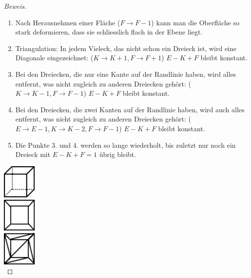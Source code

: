 \documentclass[%
11pt,%
twoside,%
titlepage,%
a4page,%
german,%
headsepline%
]{scrartcl}
\begin{document}
\begin{proof}[Beweis]
\begin{minipage}{0.618\textwidth}
\begin{enumerate}
\item Nach Herausnehmen einer Fl\"ache ($F\rightarrow F-1$) kann man die Oberfl\"ache so stark deformieren, dass sie schliesslich flach in der Ebene liegt.\\
\item Triangulation: In jedem Vieleck, das nicht schon ein Dreieck ist, wird eine Diagonale eingezeichnet: ($K\rightarrow K+1, F\rightarrow F+1$) $E-K+F$ bleibt konstant.\\
\item Bei den Dreiecken, die nur eine Kante auf der Randlinie haben, wird alles entfernt, was nicht zugleich zu anderen Dreiecken geh\"ort: ($K\rightarrow K-1, F\rightarrow  F-1$) $E-K+F$ bleibt konstant.\\
\item Bei den Dreiecken, die zwei Kanten auf der Randlinie haben, wird auch alles entfernt, was nicht zugleich zu anderen Dreiecken geh\"ort: ($E\rightarrow  E-1, K\rightarrow  K-2, F\rightarrow  F-1$) $E-K+F$ bleibt konstant.\\
\item Die Punkte 3. und 4. werden so lange wiederholt, bis zuletzt nur noch ein Dreieck mit $E-K+F=1$ \"ubrig bleibt.\\
\end{enumerate}
\end{minipage}
\hspace*{2cm}
\begin{minipage}{1.7cm}
\includegraphics[width=1.7cm]{pictures/wuerf1}\\[3ex]
\includegraphics[width=1.7cm]{pictures/wuerf2}\\[4ex]
\includegraphics[width=1.7cm]{pictures/wuerf3}\\[5ex]

\end{minipage}
\end{proof}
\end{document}
